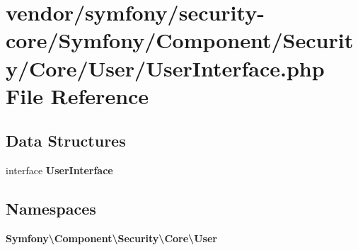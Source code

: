 \section{vendor/symfony/security-\/core/\+Symfony/\+Component/\+Security/\+Core/\+User/\+User\+Interface.php File Reference}
\label{_user_interface_8php}
\subsection*{Data Structures}
\begin{DoxyCompactItemize}
\item 
interface {\bf User\+Interface}
\end{DoxyCompactItemize}
\subsection*{Namespaces}
\begin{DoxyCompactItemize}
\item 
 {\bf Symfony\textbackslash{}\+Component\textbackslash{}\+Security\textbackslash{}\+Core\textbackslash{}\+User}
\end{DoxyCompactItemize}
